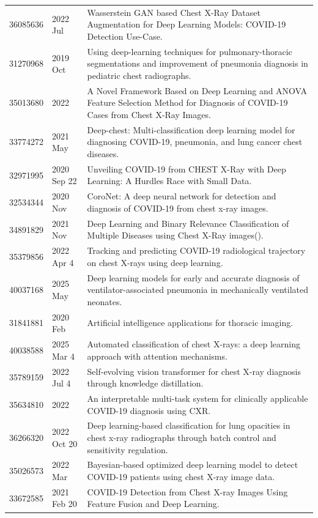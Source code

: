 \begin{longtable}{llp{9.5cm}}
36085636 & 2022 Jul & Wasserstein GAN based Chest X-Ray Dataset Augmentation for Deep Learning Models: COVID-19 Detection Use-Case. \\
31270968 & 2019 Oct & Using deep-learning techniques for pulmonary-thoracic segmentations and improvement of pneumonia diagnosis in pediatric chest radiographs. \\
35013680 & 2022 & A Novel Framework Based on Deep Learning and ANOVA Feature Selection Method for Diagnosis of COVID-19 Cases from Chest X-Ray Images. \\
33774272 & 2021 May & Deep-chest: Multi-classification deep learning model for diagnosing COVID-19, pneumonia, and lung cancer chest diseases. \\
32971995 & 2020 Sep 22 & Unveiling COVID-19 from CHEST X-Ray with Deep Learning: A Hurdles Race with Small Data. \\
32534344 & 2020 Nov & CoroNet: A deep neural network for detection and diagnosis of COVID-19 from chest x-ray images. \\
34891829 & 2021 Nov & Deep Learning and Binary Relevance Classification of Multiple Diseases using Chest X-Ray images(). \\
35379856 & 2022 Apr 4 & Tracking and predicting COVID-19 radiological trajectory on chest X-rays using deep learning. \\
40037168 & 2025 May & Deep learning models for early and accurate diagnosis of ventilator-associated pneumonia in mechanically ventilated neonates. \\
31841881 & 2020 Feb & Artificial intelligence applications for thoracic imaging. \\
40038588 & 2025 Mar 4 & Automated classification of chest X-rays: a deep learning approach with attention mechanisms. \\
35789159 & 2022 Jul 4 & Self-evolving vision transformer for chest X-ray diagnosis through knowledge distillation. \\
35634810 & 2022 & An interpretable multi-task system for clinically applicable COVID-19 diagnosis using CXR. \\
36266320 & 2022 Oct 20 & Deep learning-based classification for lung opacities in chest x-ray radiographs through batch control and sensitivity regulation. \\
35026573 & 2022 Mar & Bayesian-based optimized deep learning model to detect COVID-19 patients using chest X-ray image data. \\
33672585 & 2021 Feb 20 & COVID-19 Detection from Chest X-ray Images Using Feature Fusion and Deep Learning. \\

\end{longtable}
